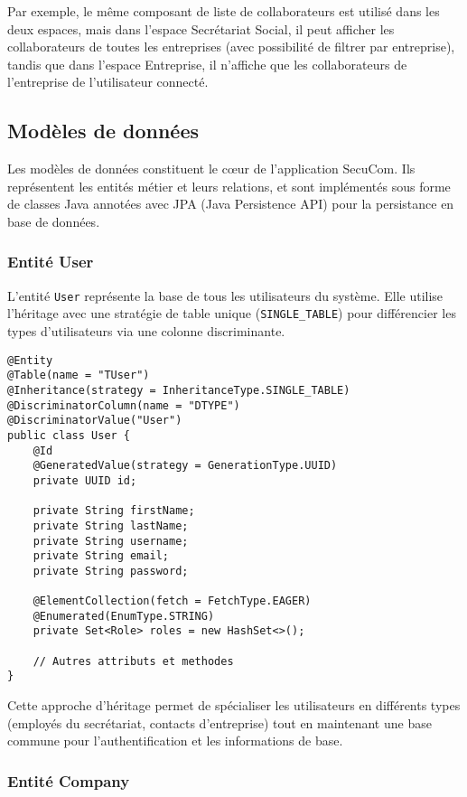 Par exemple, le même composant de liste de collaborateurs est utilisé dans les deux espaces, mais dans l'espace Secrétariat Social, il peut afficher les collaborateurs de toutes les entreprises (avec possibilité de filtrer par entreprise), tandis que dans l'espace Entreprise, il n'affiche que les collaborateurs de l'entreprise de l'utilisateur connecté.

\subsection{Modèles de données}

Les modèles de données constituent le cœur de l'application SecuCom. Ils représentent les entités métier et leurs relations, et sont implémentés sous forme de classes Java annotées avec JPA (Java Persistence API) pour la persistance en base de données.

\subsubsection{Entité User}

L'entité \texttt{User} représente la base de tous les utilisateurs du système. Elle utilise l'héritage avec une stratégie de table unique (\texttt{SINGLE\_TABLE}) pour différencier les types d'utilisateurs via une colonne discriminante.

\begin{lstlisting}
@Entity
@Table(name = "TUser")
@Inheritance(strategy = InheritanceType.SINGLE_TABLE)
@DiscriminatorColumn(name = "DTYPE")
@DiscriminatorValue("User")
public class User {
    @Id
    @GeneratedValue(strategy = GenerationType.UUID)
    private UUID id;
    
    private String firstName;
    private String lastName;
    private String username;
    private String email;
    private String password;
    
    @ElementCollection(fetch = FetchType.EAGER)
    @Enumerated(EnumType.STRING)
    private Set<Role> roles = new HashSet<>();
    
    // Autres attributs et methodes
}
\end{lstlisting}

Cette approche d'héritage permet de spécialiser les utilisateurs en différents types (employés du secrétariat, contacts d'entreprise) tout en maintenant une base commune pour l'authentification et les informations de base.

\subsubsection{Entité Company}

